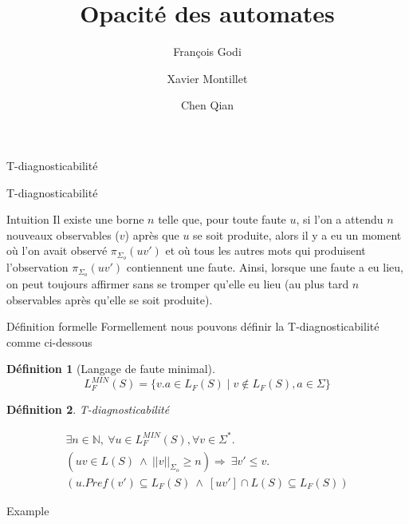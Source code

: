 \documentclass[11pt]{beamer}
\author{François Godi \and Xavier Montillet \and Chen Qian}
\title{Opacit\'e des automates}
\newtheorem{mydef}{D\'efinition}
\begin{document}
\begin{frame}
\titlepage
\end{frame}

\begin{frame}
\tableofcontents
\end{frame}

\begin{section}{T-diagnosticabilit\'e}

  \begin{frame}{T-diagnosticabilit\'e}
    \begin{block}{Intuition}
      Il existe une borne $n$ telle que, pour toute faute $u$, si l'on a attendu $n$ nouveaux observables ($v$) après que $u$ se soit produite, alors il y a eu un moment où l'on avait observé $\pi_{\Sigma_o}(uv')$ et où tous les autres mots qui produisent l'observation $\pi_{\Sigma_o}(uv')$ contiennent une faute. Ainsi, lorsque une faute a eu lieu, on peut toujours affirmer sans se tromper qu'elle eu lieu (au plus tard $n$ observables après qu'elle se soit produite).
    \end{block}
  \end{frame}

  \begin{frame}{D\'efinition formelle}
    Formellement nous pouvons d\'efinir la T-diagnosticabilit\'e comme ci-dessous

    \begin{mydef}[Langage de faute minimal]

      $$L_{F}^{MIN}(S) =  \{v.a \in L_F(S) \mid v\not \in L_F(S), a\in \Sigma \} $$
    \end{mydef}
    
    \begin{mydef}{T-diagnosticabilité}
      
      $$
      \begin{array}{l}
        \exists n \in \mathbb{N}, \ \forall u \in L^{MIN}_F(S), \forall v \in \Sigma^*.\\
        (uv \in L(S) \ \wedge \  ||v||_{\Sigma_o}\geq n) \Rightarrow \ \exists v' \leq v. \\
(u.Pref(v') \subseteq L_F(S) \ \wedge \  [uv'] \cap L(S) \subseteq L_F(S))
      \end{array}
      $$

    \end{mydef}
    
  \end{frame}

  \begin{frame}{Example}
    

\end{frame}
\end{section}
\end{document}
